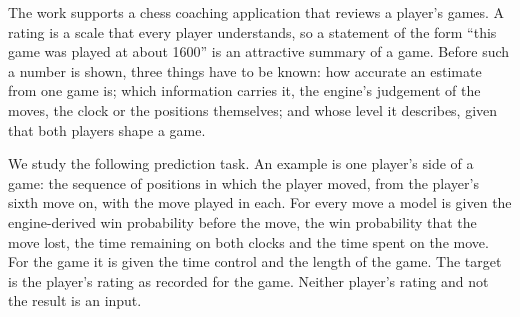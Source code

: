 \documentclass[11pt]{article}
\begin{document}
The work supports a chess coaching application that reviews a player's games.
A rating is a scale that every player understands, so a statement of the form
``this game was played at about 1600'' is an attractive summary of a game.
Before such a number is shown, three things have to be known: how accurate an
estimate from one game is; which information carries it, the engine's
judgement of the moves, the clock or the positions themselves; and whose
level it describes, given that both players shape a game.

We study the following prediction task. An example is one player's side of a
game: the sequence of positions in which the player moved, from the player's
sixth move on, with the move played in each. For every move a model is given
the engine-derived win probability before the move, the win probability that
the move lost, the time remaining on both clocks and the time spent on the
move. For the game it is given the time control and the length of the game.
The target is the player's rating as recorded for the game. Neither player's
rating and not the result is an input.
\end{document}
